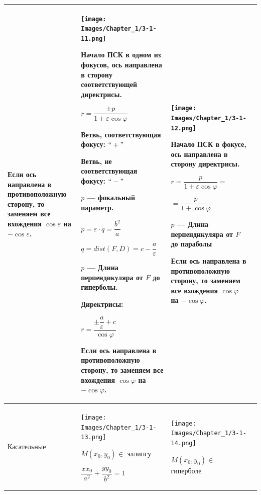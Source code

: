 \begin{center}
\begin{longtable}{|p{2.5cm}|p{4.5cm}|p{4.5cm}|p{4.5cm}|}
        Если ось направлена в противоположную сторону, то заменяем все вхождения $\cos{\varepsilon}$ на $-\cos{\varepsilon}$.
         &
        \begin{center}
            \texttt{[image: Images/Chapter\_1/3-1-11.png]}
        \end{center}
        Начало ПСК в одном из фокусов, ось направлена в сторону соответствующей директрисы.

        \(r = \dfrac{\pm p}{1 \pm \varepsilon \cos\varphi}\)

        Ветвь, соответствующая фокусу: \(``+"\)

        Ветвь, не соответствующая фокусу: \(``-"\)

        \(p\) --- фокальный параметр.

        \(p = \varepsilon \cdot q = \dfrac{b^2}{a}\)

        \(q = dist(F, D) = c - \dfrac{a}{\varepsilon}\)

        \(p\) --- Длина перпендикуляра от \(F\) до гиперболы.

        Директрисы:

        \(r = \dfrac{\pm \dfrac{a}{\varepsilon} + c}{\cos\varphi}\)

        Если ось направлена в противоположную сторону, то заменяем все вхождения $\cos{\varphi}$ на $-\cos{\varphi}$.

         &
        \begin{center}
            \texttt{[image: Images/Chapter\_1/3-1-12.png]}
        \end{center}
        Начало ПСК в фокусе, ось направлена в сторону директрисы.

        \(r = \dfrac{p}{1 + \varepsilon \cos\varphi} = \)

        \(= \dfrac{p}{1 + \cos\varphi}\)

        \(p\) --- Длина перпендикуляра от \(F\) до параболы

        Если ось направлена в противоположную сторону, то заменяем все вхождения $\cos{\varphi}$ на $-\cos{\varphi}$.
        \\
        \hline
        Касательные
         &
        \begin{center}
            \texttt{[image: Images/Chapter\_1/3-1-13.png]}
        \end{center}
        \(M(x_0, y_0) \in\) эллипсу

        \(\dfrac{x x_0}{a^2} + \dfrac{y y_0}{b^2} = 1\)
         &
        \begin{center}
            \texttt{[image: Images/Chapter\_1/3-1-14.png]}
        \end{center}
        \(M(x_0, y_0) \in\) гиперболе


\end{longtable}
\end{center}
